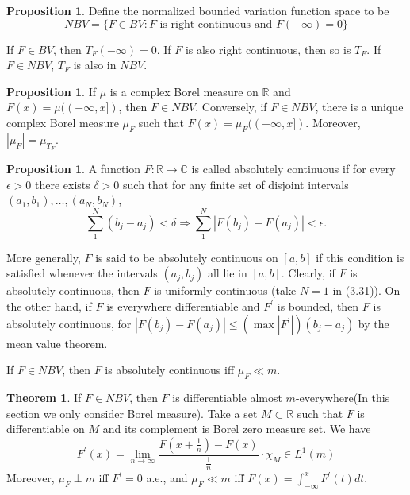 \documentclass[12pt,a4paper]{book}
\newcommand{\bb}[1]{\mathbb{#1}}
\newcommand{\p}{^{\prime}}
\theoremstyle{definition}
\newtheorem{theo}[defn]{Theorem}
\newtheorem{prop}[defn]{Proposition}
\begin{document}
\begin{prop}
    Define the normalized bounded variation function space to be
    $$
        NBV=\{F \in B V: F \text { is right continuous and } F(-\infty)=0\}
    $$

    If $F \in B V$, then $T_F(-\infty)=0$. If $F$ is also right continuous, then so is $T_F$.
    If $F\in NBV$, $T_F$ is also in $NBV$.
\end{prop}
\begin{prop}
    If $\mu$ is a complex Borel measure on $\mathbb{R}$ and $F(x)=\mu((-\infty, x])$, then $F \in N B V$. Conversely, if $F \in N B V$, there is a unique complex Borel measure $\mu_F$ such that $F(x)=\mu_F((-\infty, x])$.
    Moreover, $\left|\mu_F\right|=\mu_{T_F}$.
\end{prop}
\begin{prop}
    A function $F: \mathbb{R} \rightarrow \mathbb{C}$ is called absolutely continuous if for every $\epsilon>0$ there exists $\delta>0$ such that for any finite set of disjoint intervals $\left(a_1, b_1\right), \ldots,\left(a_N, b_N\right)$,
    $$
        \sum_1^N\left(b_j-a_j\right)<\delta \Longrightarrow \sum_1^N\left|F\left(b_j\right)-F\left(a_j\right)\right|<\epsilon .
    $$

    More generally, $F$ is said to be absolutely continuous on $[a, b]$ if this condition is satisfied whenever the intervals $\left(a_j, b_j\right)$ all lie in $[a, b]$. Clearly, if $F$ is absolutely continuous, then $F$ is uniformly continuous (take $N=1$ in (3.31)). On the other hand, if $F$ is everywhere differentiable and $F^{\prime}$ is bounded, then $F$ is absolutely continuous, for $\left|F\left(b_j\right)-F\left(a_j\right)\right| \leq\left(\max \left|F^{\prime}\right|\right)\left(b_j-a_j\right)$ by the mean value theorem.

    If $F \in N B V$, then $F$ is absolutely continuous iff $\mu_F \ll m$.
\end{prop}
\begin{theo}
    If $F \in N B V$, then $F$ is differentiable almost $m$-everywhere(In this section we only consider Borel measure).
    Take a set $M\subset\bb{R}$ such that $F$ is differentiable on $M$ and its complement
    is Borel zero measure set. We have
    \begin{equation*}
        F\p(x)=\lim_{n\to \infty}\frac{F(x+\frac{1}{n})-F(x)}{\frac{1}{n}}\cdot \chi_M\in L^1(m)
    \end{equation*}
    Moreover, $\mu_F \perp m$ iff $F^{\prime}=0$ a.e., and $\mu_F \ll m$ iff $F(x)=\int_{-\infty}^x F^{\prime}(t) d t$.
\end{theo}
\end{document}
